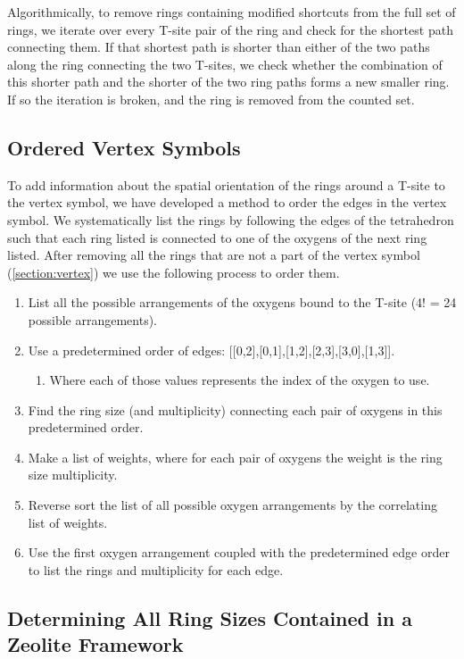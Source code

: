 \documentclass[preprint,numrefs,noinfo,sort&compress]{elsarticle}
\begin{document}
Algorithmically, to remove rings containing modified shortcuts from the full set of rings, we iterate over every T-site pair of the ring and check for the shortest path connecting them. If that shortest path is shorter than either of the two paths along the ring connecting the two T-sites, we check whether the combination of this shorter path and the shorter of the two ring paths forms a new smaller ring. If so the iteration is broken, and the ring is removed from the counted set. 

\subsection{Ordered Vertex Symbols \label{section:ov}}
\label{sec:org7db42da}

To add information about the spatial orientation of the rings around a T-site to the vertex symbol, we have developed a method to order the edges in the vertex symbol. We systematically list the rings by following the edges of the tetrahedron such that each ring listed is connected to one of the oxygens of the next ring listed. After removing all the rings that are not a part of the vertex symbol (\cref{section:vertex}) we use the following process to order them. 

\begin{enumerate}
\item List all the possible arrangements of the oxygens bound to the T-site (4! = 24 possible arrangements).
\item Use a predetermined order of edges: [[0,2],[0,1],[1,2],[2,3],[3,0],[1,3]].
\begin{enumerate}
\item Where each of those values represents the index of the oxygen to use.
\end{enumerate}
\item Find the ring size (and multiplicity) connecting each pair of oxygens in this predetermined order.
\item Make a list of weights, where for each pair of oxygens the weight is the ring size \texttimes{} multiplicity.
\item Reverse sort the list of all possible oxygen arrangements by the correlating list of weights.
\item Use the first oxygen arrangement coupled with the predetermined edge order to list the rings and multiplicity for each edge.
\end{enumerate}

\subsection{Determining All Ring Sizes Contained in a Zeolite Framework}
\label{sec:org6a29aa7}
\end{document}
